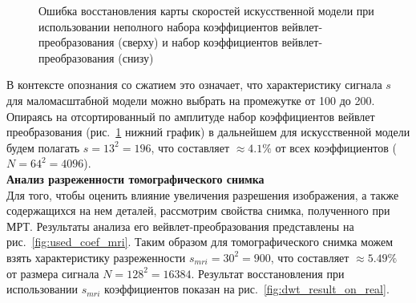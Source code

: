 \documentclass[14pt]{matmex-diploma}
\begin{document}
\begin{figure}[h]
    \centering
    \caption{Ошибка восстановления карты скоростей искусственной модели при использовании неполного набора коэффициентов вейвлет-преобразования (сверху) и набор коэффициентов вейвлет-преобразования (снизу)}
    \label{fig:used_coeff}  
\end{figure}

В контексте опознания со сжатием это означает, что характеристику сигнала $s$ для маломасштабной модели можно выбрать на промежутке от 100 до 200. Опираясь на отсортированный по амплитуде набор коэффициентов вейвлет преобразования (рис.~\ref{fig:used_coeff} нижний график) в дальнейшем для искусственной модели будем полагать $s=13^2 = 196 $, что составляет $\approx 4.1\%$ от всех коэффициентов ($N=64^2=4096$).\\

\textbf{Анализ разреженности томографического снимка} \\
Для того, чтобы оценить влияние увеличения разрешения изображения, а также содержащихся на нем деталей, рассмотрим свойства снимка, полученного при МРТ. Результаты анализа его вейвлет-преобразования представлены на рис.~\ref{fig:used_coef_mri}. Таким образом для томографического снимка можем взять характеристику разреженности $s_{mri} = 30^2 = 900$, что составляет $\approx 5.49\%$ от размера сигнала $N=128^2=16384$. Результат восстановления при использовании $s_{mri}$ коэффициентов показан на рис.~\ref{fig:dwt_result_on_real}.
\end{document}
